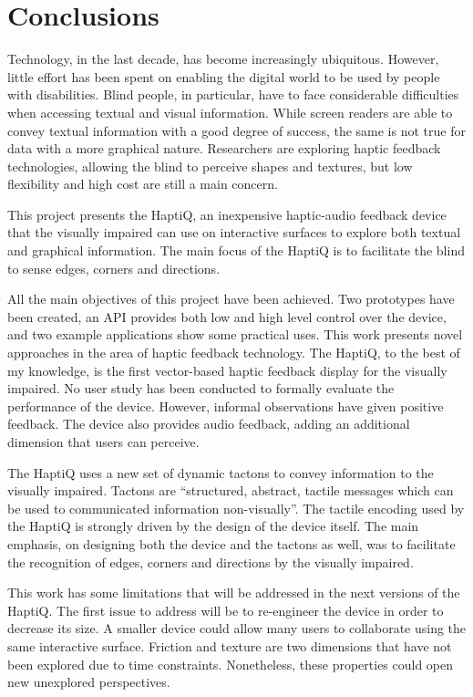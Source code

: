 \chapter{Conclusions}

Technology, in the last decade, has become increasingly ubiquitous. However, little effort has been spent on enabling the digital world to be used by people with disabilities. Blind people, in particular, have to face considerable difficulties when accessing textual and visual information. While screen readers are able to convey textual information with a good degree of success, the same is not true for data with a more graphical nature. Researchers are exploring haptic feedback technologies, allowing the blind to perceive shapes and textures, but low flexibility and high cost are still a main concern.  

This project presents the HaptiQ, an inexpensive haptic-audio feedback device that the visually impaired can use on interactive surfaces to explore both textual and graphical information. The main focus of the HaptiQ is to facilitate the blind to sense edges, corners and directions.

All the main objectives of this project have been achieved. Two prototypes have been created, an API provides both low and high level control over the device, and two example applications show some practical uses. This work presents novel approaches in the area of haptic feedback technology. The HaptiQ, to the best of my knowledge, is the first vector-based haptic feedback display for the visually impaired. No user study has been conducted to formally evaluate the performance of the device. However, informal observations have given positive feedback. The device also provides audio feedback, adding an additional dimension that users can perceive.

The HaptiQ uses a new set of dynamic tactons to convey information to the visually impaired. Tactons are ``structured, abstract, tactile messages which can be used to communicated information non-visually''\cite{brown2005first}. The tactile encoding used by the HaptiQ is strongly driven by the design of the device itself. The main emphasis, on designing both the device and the tactons as well, was to facilitate the recognition of edges, corners and directions by the visually impaired. 

This work has some limitations that will be addressed in the next versions of the HaptiQ. The first issue to address will be to re-engineer the device in order to decrease its size. A smaller device could allow many users to collaborate using the same interactive surface. Friction and texture are two dimensions that have not been explored due to time constraints. Nonetheless, these properties could open new unexplored perspectives.   

